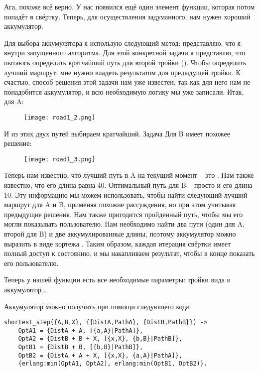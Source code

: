 Ага, похоже всё верно.
У нас появился ещё один элемент функции, которая потом попадёт в свёртку.
Теперь, для осуществления задуманного, нам нужен хороший аккумулятор.

Для выбора аккумулятора я использую следующий метод: представляю, что я внутри запущенного алгоритма.
Для этой конкретной задачи я представлю, что пытаюсь определить кратчайший путь для второй тройки ().
Чтобы определить лучший маршрут, мне нужно владеть результатом для предыдущей тройки.
К счастью, способ решения этой задачи нам уже известен, так как для него нам не понадобится аккумулятор, и всю необходимую логику мы уже записали.
Итак, для A:
\begin{figure}[h!]
    \texttt{[image: road1\_2.png]}
\end{figure}

И из этих двух путей выбираем кратчайший.
\clearpage
Задача Для B имеет похожее решение:
\begin{figure}[!htbp]
    \texttt{[image: road1\_3.png]}
\end{figure}

Теперь нам известно, что лучший путь в A на текущий момент \--- это \ops{[B,X]}.
Нам также известно, что его длина равна 40.
Оптимальный путь для B \--- просто \ops{[B]} и его длина 10.
Эту информацию мы можем использовать, чтобы найти следующий лучший маршрут для A и B, применяя похожие рассуждения, но при этом учитывая предыдущие решения.
Нам также пригодится пройденный путь, чтобы мы его могли показывать пользователю.
Нам необходимо найти два пути (один для A, второй для B) и две аккумулированные длины, поэтому аккумулятор можно выразить в виде кортежа .
Таким образом, каждая итерация свёртки имеет полный доступ к состоянию, и мы накапливаем результат, чтобы в конце показать его пользователю.

Теперь у нашей функции есть все необходимые параметры: тройки вида  и аккумулятор .

Аккумулятор можно получить при помощи следующего кода:
\begin{lstlisting}[style=erlang]
shortest_step({A,B,X}, {{DistA,PathA}, {DistB,PathB}}) ->
    OptA1 = {DistA + A, [{a,A}|PathA]},
    OptA2 = {DistB + B + X, [{x,X}, {b,B}|PathB]},
    OptB1 = {DistB + B, [{b,B}|PathB]},
    OptB2 = {DistA + A + X, [{x,X}, {a,A}|PathA]},
    {erlang:min(OptA1, OptA2), erlang:min(OptB1, OptB2)}.
\end{lstlisting}

